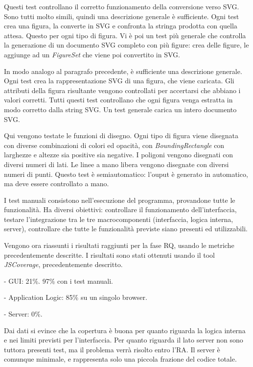 Questi test controllano il corretto funzionamento della conversione verso SVG. Sono tutti molto simili, quindi una descrizione generale \`e sufficiente. Ogni test crea una figura, la converte in SVG e confronta la stringa prodotta con quella attesa. Questo per ogni tipo di figura. Vi \`e poi un test pi\`u generale che controlla la generazione di un documento SVG completo con pi\`u figure: crea delle figure, le aggiunge ad un \textit{FigureSet} che viene poi convertito in SVG.

In modo analogo al paragrafo precedente, \`e sufficiente una descrizione generale. Ogni test crea la rappresentazione SVG di una figura, che viene caricata. Gli attributi della figura risultante vengono controllati per accertarsi che abbiano i valori corretti. Tutti questi test controllano che ogni figura venga estratta in modo corretto dalla string SVG. Un test generale carica un intero documento SVG.

Qui vengono testate le funzioni di disegno. Ogni tipo di figura viene disegnata con diverse combinazioni di colori ed opacit\`a, con \textit{BoundingRectangle} con larghezze e altezze sia positive sia negative. I poligoni vengono disegnati con diversi numeri di lati. Le linee a mano libera vengono disegnate con diversi numeri di punti. Questo test \`e semiautomatico: l'ouput \`e generato in automatico, ma deve essere controllato a mano.

I test manuali consistono nell'esecuzione del programma, provandone tutte le funzionalit\`a. Ha diversi obiettivi: controllare il funzionamento dell'interfaccia, testare l'integrazione tra le tre macrocomponenti (interfaccia, logica interna, server), controllare che tutte le funzionalit\`a previste siano presenti ed utilizzabili.

Vengono ora riassunti i risultati raggiunti per la fase RQ, usando le metriche precedentemente descritte.
I risultati sono stati ottenuti usando il tool \textit{JSCoverage}, precedentemente descritto.
\begin{elencopuntato}[\subsubsecindent]
\item[-] GUI: 21\%. 97\% con i test manuali.
\item[-] Application Logic: 85\% su un singolo browser.
\item[-] Server: 0\%.
\end{elencopuntato}
Dai dati si evince che la copertura \`e buona per quanto riguarda la logica interna e nei limiti previsti per l'interfaccia. Per quanto riguarda il lato server non sono tuttora presenti test, ma il problema verr\`a risolto entro l'RA. Il server \`e comunque minimale, e rappresenta solo una piccola frazione del codice totale.

